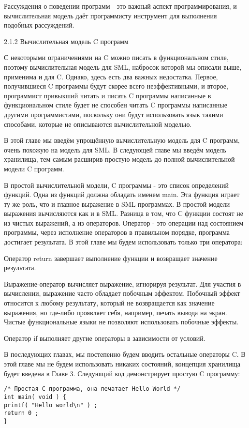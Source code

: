 Рассуждения о поведении программ - это важный аспект программирования, и вычислительная модель даёт программисту инструмент для выполнения подобных рассуждений.

2.1.2 Вычислительная модель C программ

С некоторыми ограничениями на C можно писать в функциональном стиле, поэтому вычислительная модель для SML, набросок которой мы описали выше, применима и для C. Однако, здесь есть два важных недостатка. Первое, получившиеся C программы будут скорее всего неэффективными, и второе, программист привыкший читать и писать C программы написанные в функциональном стиле будет не способен читать C программы написанные другими программистами, поскольку они будут использовать язык такими способами, которые не описываются вычислительной моделью.

В этой главе мы введём упрощённую вычислительную модель для C программ, очень похожую на модель для SML. В следующей главе мы введём модель хранилища, тем самым расширив простую модель до полной вычислительной модели C программ.

В простой вычислительной модели, C программы - это список определений функций. Одна из функций должна обладать именем main. Эта функция играет ту же роль, что и главное выражение в SML программах. В простой модели выражения вычисляются как и в SML. Разница в том, что C функции состоят не из чистых выражений, а из операторов. Оператор - это операции над состоянием программы, через исполнение операторов в правильном порядке, программа достигает результата. В этой главе мы будем использовать только три оператора:

Оператор return завершает выполнение функции и возвращает значение результата.

Выражение-оператор вычисляет выражение, игнорируя результат. Для участия в вычислении, выражение часто обладает побочным эффектом. Побочный эффект относится к любому результату, который не возвращается как значение выражения, но где-либо проявляет себя, например, печать вывода на экран. Чистые функциональные языки не позволяют использовать побочные эффекты.

Оператор if выполняет другие операторы в зависимости от условий.

В последующих главах, мы постепенно будем вводить остальные операторы C. В этой главе мы не будем использовать никаких состояний, концепция хранилища будет введена в Главе 3. Следующий код демонстрирует простую C программу:

\begin{lstlisting}
/* Простая C программа, она печатает Hello World */
int main( void ) {
printf( "Hello world\n" ) ;
return 0 ;
}
\end{lstlisting}

